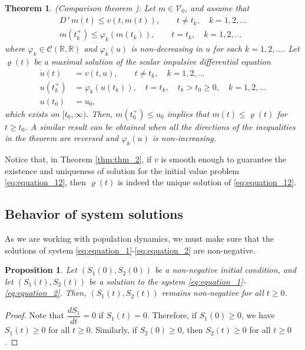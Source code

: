 \documentclass[10pt,letterpaper]{article}
\newtheorem{theorem}{Theorem}
\newtheorem{proposition}{Proposition}
\begin{document}
\begin{theorem}\label{thm:thm_2} {\rm (}Comparison theorem {\rm \cite{Laksh1989})}: Let $m \in \mathcal{V}_0$, and assume that 
\begin{align}\label{eq:equation_11}
    D^+m(t) \leq v(t,m(t)), \qquad t \neq t_k, \quad k = 1,2,...\\\nonumber
    m(t_k^+) \leq \varphi_k(m(t_k)), \qquad t = t_k, \quad k = 1,2,...
\end{align}where $\varphi_k \in \mathcal{C}(\mathbb{R},\mathbb{R})$ and $\varphi_k(u)$ is non-decreasing in $u$ for each $k =1, 2,. . .$. Let $\varrho(t)$ be a maximal solution of the scalar impulsive differential equation
\begin{align}\label{eq:equation_12}\nonumber
    \dot u(t) &= v(t,u), \qquad t \neq t_k, \quad k = 1,2,...\\
    u(t_k^+)  &= \varphi_k(u(t_k)), \quad t = t_k, \quad t_k>t_0\geq0, \quad k = 1,2,...\\
    u(t_0) &= u_0,\nonumber
\end{align}
which exists on $[t_0, \infty)$. Then, $m(t_0^+) \leq u_0$ implies that $m(t) \leq \varrho(t)$ for $t \geq t_0$. A similar result can be obtained when all the directions of the inequalities in the theorem are reversed and $\varphi_k(u)$ is non-increasing.
\end{theorem}

Notice that, in Theorem \eqref{thm:thm_2}, if $v$ is smooth enough to guarantee the existence and uniqueness of solution for the initial value problem \eqref{eq:equation_12}, then $\varrho(t)$ is indeed the unique solution of \eqref{eq:equation_12}.


\subsection{Behavior of system solutions}\label{subs:behavior}
As we are working with population dynamics, we must make sure that the solutions of system \eqref{eq:equation_1}-\eqref{eq:equation_2} are non-negative.
\begin{proposition}\label{prop:prop_1}
    Let $(S_1(0),S_2(0))$ be a non-negative initial condition, and let $(S_1(t),S_2(t))$ be a solution to the system \eqref{eq:equation_1}-\eqref{eq:equation_2}. Then, $(S_1(t),S_2(t))$ remains non-negative for all $t\geq 0$.

\end{proposition}
\begin{proof}
    Note that $\dfrac{dS_1}{dt} = 0$ if $S_1(t) = 0$. Therefore, if $S_1(0) \geq 0$, we have $S_1(t) \geq 0$ for all $t \geq 0$. Similarly, if $S_2(0) \geq 0$, then $S_2(t) \geq 0$ for all $t \geq 0$.
\end{proof}
\end{document}
